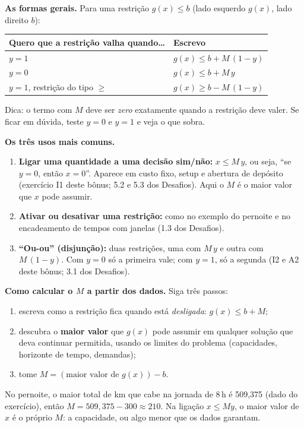 \documentclass[11pt,a4paper]{article}
\begin{document}
\textbf{As formas gerais.} Para uma restrição $g(x)\le b$ (lado esquerdo $g(x)$, lado direito $b$):
\begin{center}
\begin{tabular}{ll}
\toprule
Quero que a restrição valha quando\ldots & Escrevo\\
\midrule
$y=1$ & $g(x) \le b + M\,(1-y)$\\
$y=0$ & $g(x) \le b + M\,y$\\
$y=1$, restrição do tipo $\ge$ & $g(x) \ge b - M\,(1-y)$\\
\bottomrule
\end{tabular}
\end{center}
Dica: o termo com $M$ deve ser \emph{zero} exatamente quando a restrição deve valer. Se ficar em dúvida, teste
$y=0$ e $y=1$ e veja o que sobra.

\textbf{Os três usos mais comuns.}
\begin{enumerate}
  \item \textbf{Ligar uma quantidade a uma decisão sim/não:} $x\le M\,y$, ou seja, ``se $y=0$, então $x=0$''.
        Aparece em custo fixo, setup e abertura de depósito (exercício I1 deste bônus; 5.2 e 5.3 dos Desafios). Aqui o
        $M$ é o maior valor que $x$ pode assumir.
  \item \textbf{Ativar ou desativar uma restrição:} como no exemplo do pernoite e no encadeamento de tempos com janelas
        (1.3 dos Desafios).
  \item \textbf{``Ou-ou'' (disjunção):} duas restrições, uma com $M\,y$ e outra com $M\,(1-y)$. Com $y=0$ só a primeira
        vale; com $y=1$, só a segunda (I2 e A2 deste bônus; 3.1 dos Desafios).
\end{enumerate}

\textbf{Como calcular o $M$ a partir dos dados.} Siga três passos:
\begin{enumerate}
  \item escreva como a restrição fica quando está \emph{desligada}: $g(x)\le b+M$;
  \item descubra o \textbf{maior valor} que $g(x)$ pode assumir em qualquer solução que deva continuar permitida, usando os
        limites do problema (capacidades, horizonte de tempo, demandas);
  \item tome $M = (\text{maior valor de } g(x)) - b$.
\end{enumerate}
No pernoite, o maior total de km que cabe na jornada de 8\,h é 509,375 (dado do exercício), então $M=509{,}375-300\approx210$. Na ligação $x\le My$, o maior valor
de $x$ é o próprio $M$: a capacidade, ou algo menor que os dados garantam.
\end{document}
